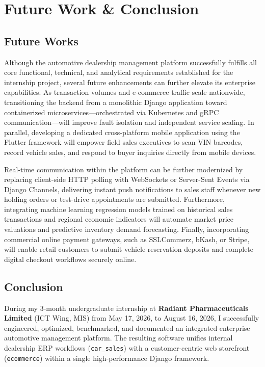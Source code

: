 \chapter{Future Work \& Conclusion}

\section{Future Works}
Although the automotive dealership management platform successfully fulfills all core functional, technical, and analytical requirements established for the internship project, several future enhancements can further elevate its enterprise capabilities. As transaction volumes and e-commerce traffic scale nationwide, transitioning the backend from a monolithic Django application toward containerized microservices—orchestrated via Kubernetes and gRPC communication—will improve fault isolation and independent service scaling. In parallel, developing a dedicated cross-platform mobile application using the Flutter framework will empower field sales executives to scan VIN barcodes, record vehicle sales, and respond to buyer inquiries directly from mobile devices.

Real-time communication within the platform can be further modernized by replacing client-side HTTP polling with WebSockets or Server-Sent Events via Django Channels, delivering instant push notifications to sales staff whenever new holding orders or test-drive appointments are submitted. Furthermore, integrating machine learning regression models trained on historical sales transactions and regional economic indicators will automate market price valuations and predictive inventory demand forecasting. Finally, incorporating commercial online payment gateways, such as SSLCommerz, bKash, or Stripe, will enable retail customers to submit vehicle reservation deposits and complete digital checkout workflows securely online.

\section{Conclusion}
During my 3-month undergraduate internship at \textbf{Radiant Pharmaceuticals Limited} (ICT Wing, MIS) from May 17, 2026, to August 16, 2026, I successfully engineered, optimized, benchmarked, and documented an integrated enterprise automotive management platform. The resulting software unifies internal dealership ERP workflows (\texttt{car\_sales}) with a customer-centric web storefront (\texttt{ecommerce}) within a single high-performance Django framework.

